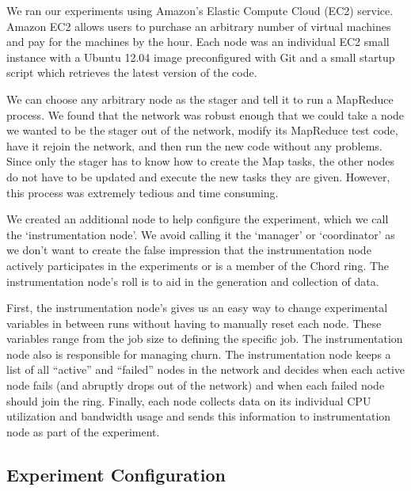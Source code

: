 We ran our experiments using Amazon's Elastic Compute Cloud (EC2) service.  Amazon EC2 allows users to purchase an arbitrary number of virtual machines and pay for the machines by the hour. Each node was an individual EC2 small instance \cite{amazon-instances} with a Ubuntu 12.04 image preconfigured with Git and a small startup script which retrieves the latest version of the code.

We can choose any arbitrary node as the stager and tell it to run a MapReduce process. We found that the network was robust enough that we could take a node we wanted to be the stager out of the network, modify its MapReduce test code, have it rejoin the network, and then run the new code without any problems. Since only the stager has to know how to create the Map tasks, the other nodes do not have to be updated and execute the new tasks they are given.  However, this process was extremely tedious and time consuming.

We created an additional node to help configure the experiment, which we call the `instrumentation node'.  We avoid calling it the `manager' or `coordinator' as we don't want to create the false impression that the instrumentation node actively participates in the experiments or is a member of the Chord ring.  The instrumentation node's roll is to aid in the generation and collection of data. 

First, the instrumentation node's gives us an easy way to change experimental variables in between runs without having to manually reset each node. These variables range from the job size to defining the specific job.  The instrumentation node also is responsible for managing churn.  The instrumentation node keeps a list of all ``active'' and ``failed'' nodes in the network and decides when each active node fails (and abruptly drops out of the network) and when each failed node should join the ring.  Finally, each node collects data on its individual CPU utilization and bandwidth usage and sends this information to instrumentation node as part of the experiment. 

\subsection{Experiment Configuration}

